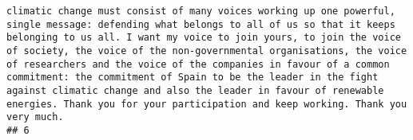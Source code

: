 \documentclass[
]{article}
\begin{document}
\begin{verbatim}
climatic change must consist of many voices working up one powerful, single message: defending what belongs to all of us so that it keeps belonging to us all. I want my voice to join yours, to join the voice of society, the voice of the non-governmental organisations, the voice of researchers and the voice of the companies in favour of a common commitment: the commitment of Spain to be the leader in the fight against climatic change and also the leader in favour of renewable energies. Thank you for your participation and keep working. Thank you very much.
## 6                                                                                                                                                                                                                                                                                                                                                                                                                                                                                                                                                                                                                                                                                                                                                                                                                                                                                                                                                                                                                                                                                                                                                                                                                                                                                                                                                                                                                                                                                                                                                                                                                                                                                                                                                                                                                                                                                                                                                                                                                                                                                                                                                                                                                                                                                                                                                                                                                                                                                                                                                                                                                                                                                                                                                                                                                                                                 
\end{verbatim}
\end{document}
